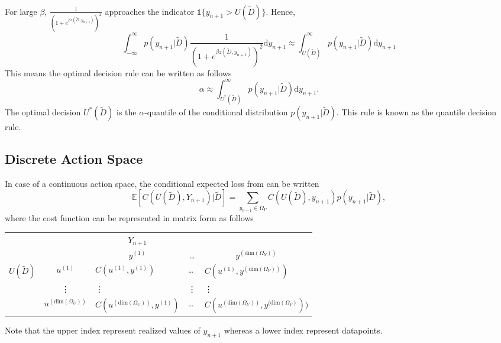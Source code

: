 \begin{example}
\begin{equation}
\begin{split}
		\end{split}
	\end{equation}
	For large $\beta$, $\frac{1}{(1+e^{\beta z(\tilde{D},y_{n+1})})^2}$ approaches the indicator $\mathbb{1}\{y_{n+1}>U(\tilde{D})\}$. Hence,
	\begin{equation}
		\int_{-\infty}^{\infty} p(y_{n+1}|\tilde{D})\frac{1}{(1+e^{\beta z(\tilde{D},y_{n+1})})^2} \mathrm{d}y_{n+1} \approx \int_{U(\tilde{D})}^{\infty} p(y_{n+1}|\tilde{D}) \mathrm{d}y_{n+1}
	\end{equation}
	This means the optimal decision rule can be written as follows
	\begin{equation}
		\alpha \approx \int_{U^*(\tilde{D})}^{\infty} p(y_{n+1}|\tilde{D}) \mathrm{d}y_{n+1}.
		\label{eq:quantile_decision_rule}
	\end{equation}
	The optimal decision $U^*(\tilde{D})$ is the $\alpha$-quantile of the conditional distribution $p(y_{n+1}|\tilde{D})$. This rule is known as the quantile decision rule.
\end{example}

\subsection{Discrete Action Space}
In case of a continuous action space, the conditional expected loss from  can be written
\begin{equation}
	\mathbb{E}[C(U(\tilde{D}), Y_{n+1})|\tilde{D}] = \sum_{y_{n+1}\in \Omega_Y}C(U(\tilde{D}),y_{n+1})p(y_{n+1}|\tilde{D}),
	\label{eq:conditional_cost_discrete}
\end{equation}
where the cost function can be represented in matrix form as follows
\begin{center}
	\begin{tabular}{ c  c  c  c  c  }
		&& $Y_{n+1}$& & \\
		&& $y^{(1)}$ & \dots & $y^{(\text{dim}(\Omega_Y))}$ \\
		\cline{3-5}
		$U(\tilde{D})$ & $u^{(1)}$& \multicolumn{1}{|l}{$C(u^{(1)}, y^{(1)})$} &\multicolumn{1}{l}{\dots}&\multicolumn{1}{l|}{$C(u^{(1)}, y^{(\text{dim}(\Omega_Y))})$} \\
		& \vdots & \multicolumn{1}{|l}{\vdots} &\multicolumn{1}{l}{\vdots}&\multicolumn{1}{l|}{\vdots} \\
		& $u^{(\text{dim}(\Omega_U))}$ & \multicolumn{1}{|l}{$C(u^{(\text{dim}(\Omega_U))}, y^{(1)})$} &\multicolumn{1}{l}{\dots}&\multicolumn{1}{l|}{$C(u^{(\text{dim}(\Omega_U))}, y^{(\text{dim}(\Omega_Y)}))$} \\
		\cline{3-5}
	\end{tabular}
\end{center}
Note that the upper index represent realized values of $y_{n+1}$ whereas a lower index represent datapoints.

